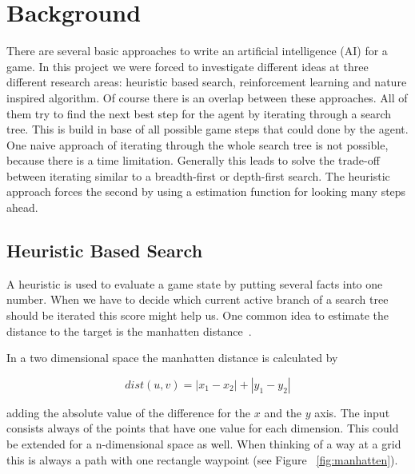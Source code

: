 

\section{Background} 
\label{sec:back}

There are several basic approaches to write an artificial intelligence (AI) for a game. In this project we were forced to investigate different ideas at three different research areas: heuristic based search, reinforcement learning and nature inspired algorithm. 
Of course there is an overlap between these approaches. All of them try to find the next best step for the agent by iterating through a search tree. This is build in base of all possible game steps that could done by the agent.
One naive approach of iterating through the whole search tree is not possible, because there is a time limitation.
Generally this leads to solve the trade-off between iterating similar to a breadth-first or depth-first search.
The heuristic approach forces the second by using a estimation function for looking many steps ahead.


\subsection{Heuristic Based Search} 

A heuristic is used to evaluate a game state by putting several facts into one number. When we have to decide which current active branch of a search tree should be iterated this score might help us. 
One common idea to estimate the distance to the target is the manhatten distance~\cite{distance_metrics}. 

In a two dimensional space the manhatten distance is calculated by

\begin{equation}
dist(u,v) = |x_{1} - x_{2}| + |y_{1} - y_{2}|
\end{equation}

adding the absolute value of the difference for the $x$ and the $y$ axis. The input consists always of the points that have one value for each dimension. This could be extended for a n-dimensional space as well. When thinking of a way at a grid this is always a path with one rectangle waypoint (see Figure ~\ref{fig:manhatten}).

